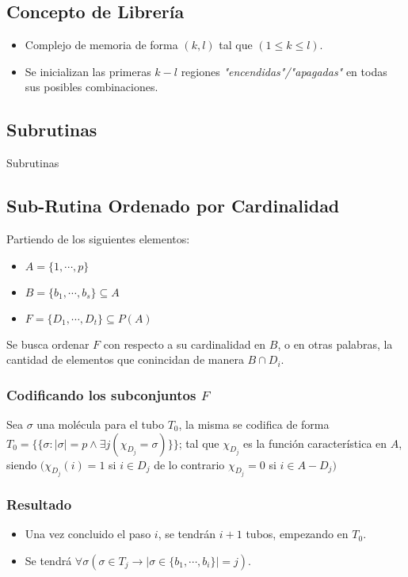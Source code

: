 \documentclass[12pt]{beamer}
\begin{document}
 \begin{frame}
     \subsection{Concepto de Librería}
     \begin{itemize}
         \item Complejo de memoria de forma $(k,l)$ tal que  $(1 \leq k \leq l)$.
         \item Se inicializan las primeras $k - l$ regiones \emph{"encendidas"/"apagadas"} en todas sus posibles combinaciones.
     \end{itemize}
 \end{frame}
 \begin{frame}
    \section{Subrutinas}
    Subrutinas
 \end{frame}
 \begin{frame}
     \subsection{Sub-Rutina Ordenado por Cardinalidad}
     Partiendo de los siguientes elementos:
     \begin{itemize}
        \item $A = \{1,\cdots,p\}$
        \item $B = \{b_1,\cdots,b_s\} \subseteq A$ 
        \item $F = \{D_1,\cdots,D_t\} \subseteq P(A)$ 
    \end{itemize}
    Se busca ordenar $F$ con respecto a su cardinalidad en $B$, o en otras palabras, la cantidad de elementos que conincidan de manera $B\cap D_i$.
 \end{frame}
 \begin{frame}
     \frametitle{Codificando los subconjuntos $F$}
     Sea $\sigma$ una molécula  para el tubo $T_0$, la misma se codifica de forma $T_0=\{\{\sigma:|\sigma|=p \land \exists j(\chi_{D_j}=\sigma)\}\}$; tal que $\chi_{D_j}$ es la función característica en $A$, siendo $(\chi_{D_j}(i) = 1$ si $i \in D_j$ de lo contrario $\chi_{D_j} = 0$ si $i \in A - D_j)$
 \end{frame}
 \begin{frame}
     \frametitle{Resultado}
     \begin{itemize}
         \item Una vez concluido el paso $i$, se tendrán $i +1$ tubos, empezando en $T_0$.
         \item Se tendrá $\forall\sigma(\sigma\in T_j \rightarrow|\sigma\in\{b_1,\cdots,b_i\}|=j)$.
     \end{itemize}
 \end{frame}
\end{document}
